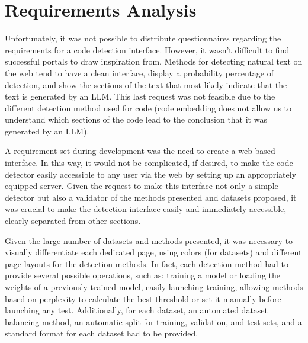 \clearpage
\section{Requirements Analysis}
Unfortunately, it was not possible to distribute questionnaires regarding 
the requirements for a code detection interface. However, it wasn't difficult 
to find successful portals to draw inspiration from. Methods for detecting 
natural text on the web tend to have a clean interface, display a probability 
percentage of detection, and show the sections of the text that most likely 
indicate that the text is generated by an LLM. This last request was not 
feasible due to the different detection method used for code 
(code embedding does not allow us to understand which sections of 
the code lead to the conclusion that it was generated by an LLM).

A requirement set during development was the need to create a web-based 
interface. In this way, it would not be complicated, if desired, to make 
the code detector easily accessible to any user via the web by setting up 
an appropriately equipped server. Given the request to make this interface 
not only a simple detector but also a validator of the methods presented 
and datasets proposed, it was crucial to make the detection interface easily 
and immediately accessible, clearly separated from other sections.

Given the large number of datasets and methods presented, it was necessary 
to visually differentiate each dedicated page, using colors (for datasets) 
and different page layouts for the detection methods. In fact, each detection 
method had to provide several possible operations, such as: training a model or 
loading the weights of a previously trained model, easily launching training, 
allowing methods based on perplexity to calculate the best threshold or set it 
manually before launching any test. Additionally, for each dataset, an automated 
dataset balancing method, an automatic split for training, validation, and test 
sets, and a standard format for each dataset had to be provided.